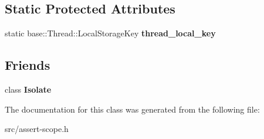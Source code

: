 \subsection*{Static Protected Attributes}
\begin{DoxyCompactItemize}
\item 
\hypertarget{classv8_1_1internal_1_1_per_thread_assert_scope_base_a18b0e01d2b5961233328ed81b7e63a76}{}static base\+::\+Thread\+::\+Local\+Storage\+Key {\bfseries thread\+\_\+local\+\_\+key}\label{classv8_1_1internal_1_1_per_thread_assert_scope_base_a18b0e01d2b5961233328ed81b7e63a76}

\end{DoxyCompactItemize}
\subsection*{Friends}
\begin{DoxyCompactItemize}
\item 
\hypertarget{classv8_1_1internal_1_1_per_thread_assert_scope_base_aba4f0964bdacf2bbf62cf876e5d28d0a}{}class {\bfseries Isolate}\label{classv8_1_1internal_1_1_per_thread_assert_scope_base_aba4f0964bdacf2bbf62cf876e5d28d0a}

\end{DoxyCompactItemize}


The documentation for this class was generated from the following file\+:\begin{DoxyCompactItemize}
\item 
src/assert-\/scope.\+h\end{DoxyCompactItemize}
